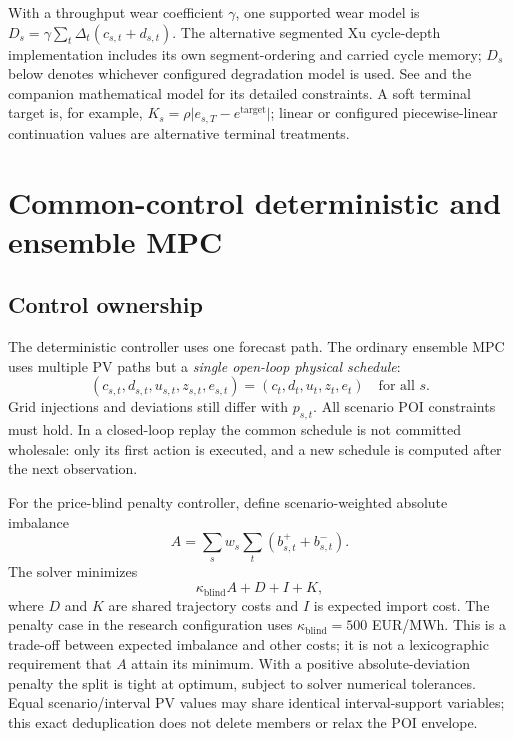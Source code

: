 \documentclass[11pt,a4paper]{article}
\begin{document}
With a throughput wear coefficient $\gamma$, one supported wear model is
$D_s=\gamma\sum_t\Delta_t(c_{s,t}+d_{s,t})$. The alternative segmented Xu
cycle-depth implementation includes its own segment-ordering and carried cycle
memory; $D_s$ below denotes whichever configured degradation model is used.
See  and the companion mathematical
model for its detailed constraints. A soft terminal target is, for example,
$K_s=\rho\lvert e_{s,T}-e^{\mathrm{target}}\rvert$; linear or configured
piecewise-linear continuation values are alternative terminal treatments.

\section{Common-control deterministic and ensemble MPC}
\subsection{Control ownership}
The deterministic controller uses one forecast path. The ordinary ensemble MPC
uses multiple PV paths but a \emph{single open-loop physical schedule}:
\begin{equation}
(c_{s,t},d_{s,t},u_{s,t},z_{s,t},e_{s,t})
 =(c_t,d_t,u_t,z_t,e_t)\quad\text{for all }s.
\end{equation}
Grid injections and deviations still differ with $p_{s,t}$. All scenario POI
constraints must hold. In a closed-loop replay the common schedule is not
committed wholesale: only its first action is executed, and a new schedule is
computed after the next observation.

For the price-blind penalty controller, define scenario-weighted absolute
imbalance
\begin{equation}
 A=\sum_s w_s\sum_t(b^+_{s,t}+b^-_{s,t}).
\end{equation}
The solver minimizes
\begin{equation}\label{eq:blind}
 \kappa_{\mathrm{blind}} A + D + I + K,
\end{equation}
where $D$ and $K$ are shared trajectory costs and $I$ is expected import cost.
The penalty case in the research configuration uses $\kappa_{\mathrm{blind}}=500$
EUR/MWh. This is a trade-off between expected imbalance and other costs; it is
not a lexicographic requirement that $A$ attain its minimum. With a positive
absolute-deviation penalty the split is tight at optimum, subject to solver
numerical tolerances. Equal scenario/interval PV values may share identical
interval-support variables; this exact deduplication does not delete members or
relax the POI envelope.
\end{document}
